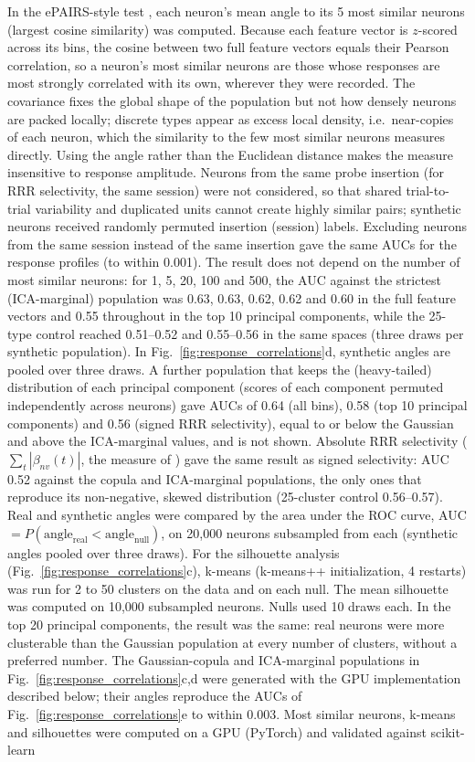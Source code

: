 \documentclass[10pt,lineno]{elife}
\begin{document}
In the ePAIRS-style test \cite{raposo2014category,hirokawa2019frontal}, each neuron's mean angle to its 5 most similar neurons (largest cosine similarity) was computed. Because each feature vector is $z$-scored across its bins, the cosine between two full feature vectors equals their Pearson correlation, so a neuron's most similar neurons are those whose responses are most strongly correlated with its own, wherever they were recorded. The covariance fixes the global shape of the population but not how densely neurons are packed locally; discrete types appear as excess local density, i.e.\ near-copies of each neuron, which the similarity to the few most similar neurons measures directly. Using the angle rather than the Euclidean distance makes the measure insensitive to response amplitude. Neurons from the same probe insertion (for RRR selectivity, the same session) were not considered, so that shared trial-to-trial variability and duplicated units cannot create highly similar pairs; synthetic neurons received randomly permuted insertion (session) labels. Excluding neurons from the same session instead of the same insertion gave the same AUCs for the response profiles (to within 0.001). The result does not depend on the number of most similar neurons: for 1, 5, 20, 100 and 500, the AUC against the strictest (ICA-marginal) population was 0.63, 0.63, 0.62, 0.62 and 0.60 in the full feature vectors and 0.55 throughout in the top 10 principal components, while the 25-type control reached 0.51--0.52 and 0.55--0.56 in the same spaces (three draws per synthetic population). In Fig.~\ref{fig:response_correlations}d, synthetic angles are pooled over three draws. A further population that keeps the (heavy-tailed) distribution of each principal component (scores of each component permuted independently across neurons) gave AUCs of 0.64 (all bins), 0.58 (top 10 principal components) and 0.56 (signed RRR selectivity), equal to or below the Gaussian and above the ICA-marginal values, and is not shown. Absolute RRR selectivity ($\sum_t|\beta_{nv}(t)|$, the measure of \cite{posani2026rarely}) gave the same result as signed selectivity: AUC 0.52 against the copula and ICA-marginal populations, the only ones that reproduce its non-negative, skewed distribution (25-cluster control 0.56--0.57). Real and synthetic angles were compared by the area under the ROC curve, AUC $=P(\text{angle}_\text{real}<\text{angle}_\text{null})$, on 20,000 neurons subsampled from each (synthetic angles pooled over three draws). For the silhouette analysis (Fig.~\ref{fig:response_correlations}c), k-means (k-means++ initialization, 4 restarts) was run for 2 to 50 clusters on the data and on each null. The mean silhouette was computed on 10,000 subsampled neurons. Nulls used 10 draws each. In the top 20 principal components, the result was the same: real neurons were more clusterable than the Gaussian population at every number of clusters, without a preferred number. The Gaussian-copula and ICA-marginal populations in Fig.~\ref{fig:response_correlations}c,d were generated with the GPU implementation described below; their angles reproduce the AUCs of Fig.~\ref{fig:response_correlations}e to within 0.003. Most similar neurons, k-means and silhouettes were computed on a GPU (PyTorch) and validated against scikit-learn 
\end{document}

